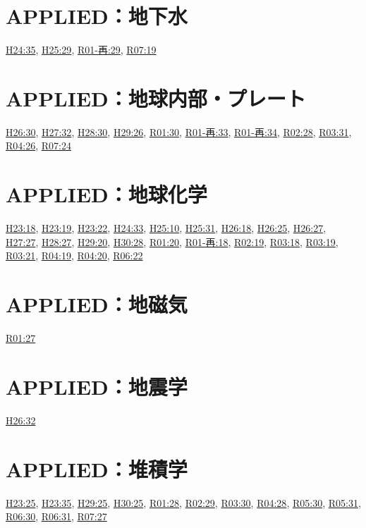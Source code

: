 \section{APPLIED：地下水}
\hyperref[q:h24-reg-applied-35]{H24:35}, \hyperref[q:h25-reg-applied-29]{H25:29}, \hyperref[q:r01-ret-applied-29]{R01-再:29}, \hyperref[q:r07-reg-applied-19]{R07:19}
\section{APPLIED：地球内部・プレート}
\hyperref[q:h26-reg-applied-30]{H26:30}, \hyperref[q:h27-reg-applied-32]{H27:32}, \hyperref[q:h28-reg-applied-30]{H28:30}, \hyperref[q:h29-reg-applied-26]{H29:26}, \hyperref[q:r01-reg-applied-30]{R01:30}, \hyperref[q:r01-ret-applied-33]{R01-再:33}, \hyperref[q:r01-ret-applied-34]{R01-再:34}, \hyperref[q:r02-reg-applied-28]{R02:28}, \hyperref[q:r03-reg-applied-31]{R03:31}, \hyperref[q:r04-reg-applied-26]{R04:26}, \hyperref[q:r07-reg-applied-24]{R07:24}
\section{APPLIED：地球化学}
\hyperref[q:h23-reg-applied-18]{H23:18}, \hyperref[q:h23-reg-applied-19]{H23:19}, \hyperref[q:h23-reg-applied-22]{H23:22}, \hyperref[q:h24-reg-applied-33]{H24:33}, \hyperref[q:h25-reg-applied-10]{H25:10}, \hyperref[q:h25-reg-applied-31]{H25:31}, \hyperref[q:h26-reg-applied-18]{H26:18}, \hyperref[q:h26-reg-applied-25]{H26:25}, \hyperref[q:h26-reg-applied-27]{H26:27}, \hyperref[q:h27-reg-applied-27]{H27:27}, \hyperref[q:h28-reg-applied-27]{H28:27}, \hyperref[q:h29-reg-applied-20]{H29:20}, \hyperref[q:h30-reg-applied-28]{H30:28}, \hyperref[q:r01-reg-applied-20]{R01:20}, \hyperref[q:r01-ret-applied-18]{R01-再:18}, \hyperref[q:r02-reg-applied-19]{R02:19}, \hyperref[q:r03-reg-applied-18]{R03:18}, \hyperref[q:r03-reg-applied-19]{R03:19}, \hyperref[q:r03-reg-applied-21]{R03:21}, \hyperref[q:r04-reg-applied-19]{R04:19}, \hyperref[q:r04-reg-applied-20]{R04:20}, \hyperref[q:r06-reg-applied-22]{R06:22}
\section{APPLIED：地磁気}
\hyperref[q:r01-reg-applied-27]{R01:27}
\section{APPLIED：地震学}
\hyperref[q:h26-reg-applied-32]{H26:32}
\section{APPLIED：堆積学}
\hyperref[q:h23-reg-applied-25]{H23:25}, \hyperref[q:h23-reg-applied-35]{H23:35}, \hyperref[q:h29-reg-applied-25]{H29:25}, \hyperref[q:h30-reg-applied-25]{H30:25}, \hyperref[q:r01-reg-applied-28]{R01:28}, \hyperref[q:r02-reg-applied-29]{R02:29}, \hyperref[q:r03-reg-applied-30]{R03:30}, \hyperref[q:r04-reg-applied-28]{R04:28}, \hyperref[q:r05-reg-applied-30]{R05:30}, \hyperref[q:r05-reg-applied-31]{R05:31}, \hyperref[q:r06-reg-applied-30]{R06:30}, \hyperref[q:r06-reg-applied-31]{R06:31}, \hyperref[q:r07-reg-applied-27]{R07:27}
